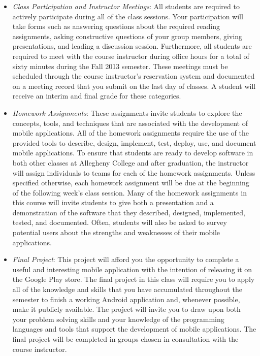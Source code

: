 \begin{itemize}

	\item {\em Class Participation and Instructor Meetings}: All students are required to actively participate during
		all of the class sessions. Your participation will take forms such as answering questions about the required
		reading assignments, asking constructive questions of your group members, giving presentations, and leading a
		discussion session. Furthermore, all students are required to meet with the course instructor during office
		hours for a total of sixty minutes during the Fall 2013 semester.  These meetings must be scheduled through the
		course instructor's reservation system and documented on a meeting record that you submit on the last day of
		classes. A student will receive an interim and final grade for these categories.

	\item {\em Homework Assignments}: These assignments invite students to explore the concepts, tools, and techniques
		that are associated with the development of mobile applications.  All of the homework assignments require the
		use of the provided tools to describe, design, implement, test, deploy, use, and document mobile applications.
		To ensure that students are ready to develop software in both other classes at Allegheny College and after
		graduation, the instructor will assign individuals to teams for each of the homework assignments.  Unless
		specified otherwise, each homework assignment will be due at the beginning of the following week's class
		session.  Many of the homework assignments in this course will invite students to give both a presentation and a
		demonstration of the software that they described, designed, implemented, tested, and documented. Often,
		students will also be asked to survey potential users about the strengths and weaknesses of their mobile
		applications.
	
	\item {\em Final Project}: This project will afford you the opportunity to complete a useful and interesting mobile
		application with the intention of releasing it on the Google Play store.	The final project in this class will
		require you to apply all of the knowledge and skills that you have accumulated throughout the semester
		to finish a working Android application and, whenever possible, make it publicly available.  The project will
		invite you to draw upon both your problem solving skills and your knowledge of the programming languages and tools
		that support the development of mobile applications. The final project will be completed in groups chosen in
		consultation with the course instructor.
		
\end{itemize}

